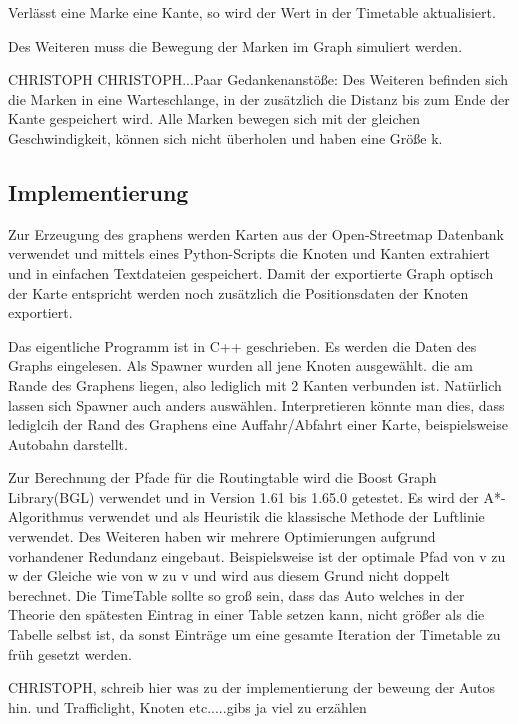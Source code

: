 \documentclass[paper=A4,pagesize=auto,12pt,headinclude=true,footinclude=true,BCOR=0mm,DIV=calc]{scrartcl}
\begin{document}
	Verlässt eine Marke eine Kante, so wird der Wert in der Timetable aktualisiert. 
	
	Des Weiteren muss die Bewegung der Marken im Graph simuliert werden.
	
	CHRISTOPH
	CHRISTOPH...Paar Gedankenanstöße: Des Weiteren befinden sich die Marken in eine Warteschlange, in der zusätzlich die Distanz bis zum Ende der Kante gespeichert wird. Alle Marken bewegen sich mit der gleichen Geschwindigkeit, können sich nicht überholen und haben eine Größe k. 

	 
	 
	 \subsection{Implementierung}
	 Zur Erzeugung des graphens werden Karten aus der Open-Streetmap Datenbank \cite{OSM} verwendet und mittels eines Python-Scripts die Knoten und Kanten extrahiert und in einfachen Textdateien gespeichert. Damit der exportierte Graph optisch der Karte entspricht werden noch zusätzlich die Positionsdaten der Knoten exportiert.
	 
	 Das eigentliche Programm ist in C++ geschrieben. Es werden die Daten des Graphs eingelesen. Als Spawner wurden all jene Knoten ausgewählt. die am Rande des Graphens liegen, also lediglich mit 2 Kanten verbunden ist. Natürlich lassen sich Spawner auch anders auswählen. Interpretieren könnte man dies, dass lediglcih der Rand des Graphens eine Auffahr/Abfahrt einer Karte, beispielsweise Autobahn darstellt.
	 
	 Zur Berechnung der Pfade für die Routingtable wird die Boost Graph Library(BGL) \cite{Boost} verwendet und in Version 1.61 bis 1.65.0 getestet. Es wird der A*-Algorithmus verwendet und als Heuristik die klassische Methode der Luftlinie verwendet. Des Weiteren haben wir mehrere Optimierungen aufgrund vorhandener Redundanz eingebaut. Beispielsweise ist der optimale Pfad von v zu w der Gleiche wie von w zu v und wird aus diesem Grund nicht doppelt berechnet. 
	 Die TimeTable sollte so groß sein, dass das Auto welches in der Theorie den spätesten Eintrag in einer Table setzen kann, nicht größer als die Tabelle selbst ist, da sonst Einträge um eine gesamte Iteration der Timetable zu früh gesetzt werden. 
	 
	 CHRISTOPH, schreib hier was zu der implementierung der beweung der Autos hin. und Trafficlight, Knoten etc.....gibs ja viel zu erzählen
	
	
	\newpage
	
\end{document}
